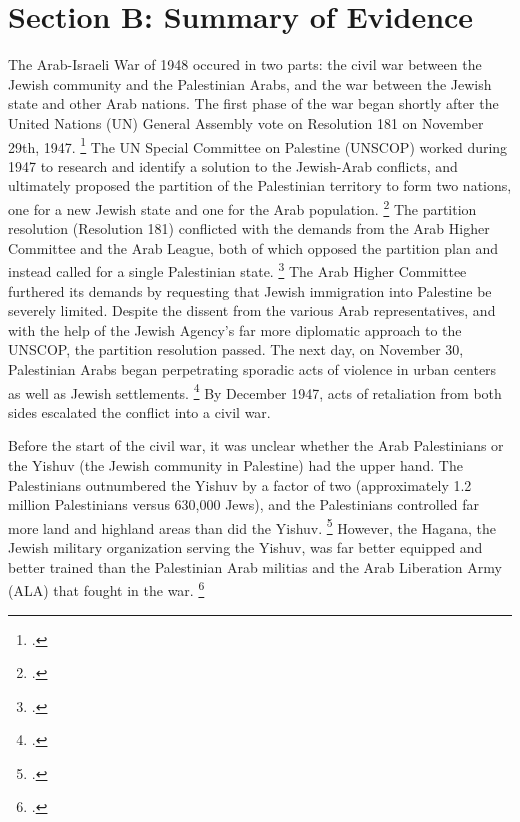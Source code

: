 \documentclass[11pt]{turabian-researchpaper}
\begin{document}
\section{Section B: Summary of Evidence}
The Arab-Israeli War of 1948 occured in two parts: the civil war between the Jewish community and the Palestinian Arabs, and the war between the Jewish state and other Arab nations.  The first phase of the war began shortly after the United Nations (UN) General Assembly vote on Resolution 181 on November 29th, 1947.
\footcite[][]{tal}
The UN Special Committee on Palestine (UNSCOP) worked during 1947 to research and identify a solution to the Jewish-Arab conflicts, and ultimately proposed the partition of the Palestinian territory to form two nations, one for a new Jewish state and one for the Arab population.
\footcite[][22]{pappe}
The partition resolution (Resolution 181) conflicted with the demands from the Arab Higher Committee and the Arab League, both of which opposed the partition plan and instead called for a single Palestinian state.
\footcite[][23]{pappe}
The Arab Higher Committee furthered its demands by requesting that Jewish immigration into Palestine be severely limited.  Despite the dissent from the various Arab representatives, and with the help of the Jewish Agency's far more diplomatic approach to the UNSCOP, the partition resolution passed.  The next day, on November 30, Palestinian Arabs began perpetrating sporadic acts of violence in urban centers as well as Jewish settlements.
\footcite[][77]{morris}
By December 1947, acts of retaliation from both sides escalated the conflict into a civil war.



Before the start of the civil war, it was unclear whether the Arab Palestinians or the Yishuv (the Jewish community in Palestine) had the upper hand.  The Palestinians outnumbered the Yishuv by a factor of two (approximately 1.2 million Palestinians versus 630,000 Jews), and the Palestinians controlled far more land and highland areas than did the Yishuv.
\footcite[][30]{bartal}
However, the Hagana, the Jewish military organization serving the Yishuv, was far better equipped and better trained than the Palestinian Arab militias and the Arab Liberation Army (ALA) that fought in the war.
\footcite[][81]{morris}
\end{document}
